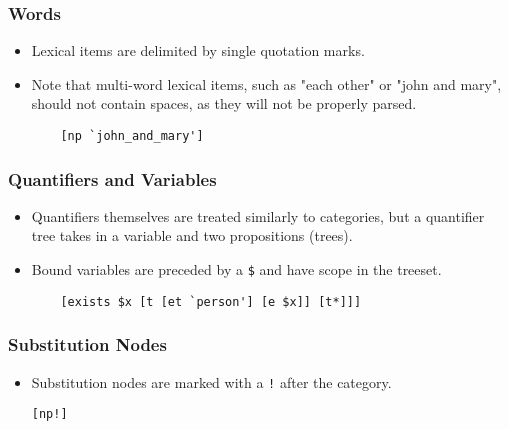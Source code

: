 \documentclass[10.5pt]{article}
\newcommand{\code}[1]{\texttt{#1}}
\begin{document}
\subsubsection{Words}
  \begin{itemize}
	\item Lexical items are delimited by single quotation marks.
	\item Note that multi-word lexical items, such as "each other" or "john and mary",
	  should not contain spaces, as they will not be properly parsed.
	  
	\begin{mdframed}[backgroundcolor=blue!5] 
	\begin{verbatim}
	[np `john_and_mary']
	\end{verbatim}
	\end{mdframed}
  \end{itemize}
  
\subsubsection{Quantifiers and Variables}
  \begin{itemize}
	\item Quantifiers themselves are treated similarly to categories,
	  but a quantifier tree takes in a variable and two propositions (trees).
	\item Bound variables are preceded by a \code{\$} and have scope in the treeset.
	
	\begin{mdframed}[backgroundcolor=blue!5] 
	\begin{verbatim}
	[exists $x [t [et `person'] [e $x]] [t*]]]
	\end{verbatim}
	\end{mdframed}
  \end{itemize}

\subsubsection{Substitution Nodes}
  \begin{itemize}
	\item Substitution nodes are marked with a \code{!} after the category.
	
	\begin{mdframed}[backgroundcolor=blue!5] 
	\begin{verbatim}[np!]
	\end{verbatim}
	\end{mdframed}
  \end{itemize}
\end{document}
